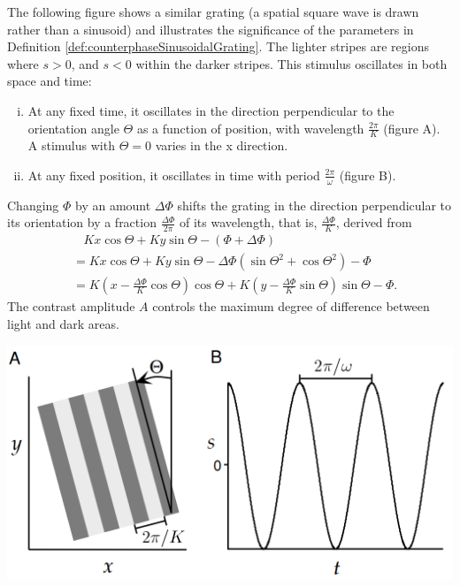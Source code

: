 \begin{exm}
  The following figure shows a similar grating (a spatial square wave is drawn rather than a sinusoid) and illustrates the significance of the parameters in Definition \ref{def:counterphaseSinusoidalGrating}. The lighter stripes are regions where $s>0$, and $s<0$ within the darker stripes.
  This stimulus oscillates in both space and time:
  \begin{enumerate}[(i)]
  \item At any fixed time, it oscillates in the direction perpendicular to the orientation angle $\Theta$ as a function of position, with wavelength $\frac{2\pi}{K}$ (figure A). A stimulus with $\Theta = 0$ varies in the x direction.
  \item At any fixed position, it oscillates in time with period $\frac{2\pi}{\omega}$ (figure B).
  \end{enumerate}
  Changing $\Phi$ by an amount $\Delta\Phi$ shifts the grating
  in the direction perpendicular to its orientation by a fraction $\frac{\Delta\Phi}{2\pi}$ of its wavelength, that is, $\frac{\Delta\Phi}{K}$, derived from
  \begin{displaymath}
    \begin{aligned}
      &\ \ \ \ Kx\cos\Theta + Ky\sin\Theta-(\Phi+\Delta\Phi)\\
      &= Kx\cos\Theta + Ky\sin\Theta - \Delta\Phi(\sin\Theta^2+\cos\Theta^2) -\Phi\\
      &= K(x-\frac{\Delta\Phi}{K}\cos\Theta)\cos\Theta + K(y-\frac{\Delta\Phi}{K}\sin\Theta)\sin\Theta-\Phi.
    \end{aligned}
  \end{displaymath}
  The contrast amplitude $A$ controls the maximum degree of difference between light and dark areas.
  \begin{center}
    \includegraphics[scale=0.2]{./png/squareWave}
  \end{center}
\end{exm}

